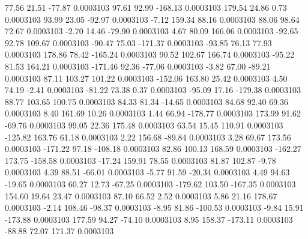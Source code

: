        77.56       21.51      -77.87     0.0003103
       97.61       92.99     -168.13     0.0003103
      179.54       24.86        0.73     0.0003103
       93.99       23.05      -92.97     0.0003103
       -7.12      159.34       88.16     0.0003103
       88.06       98.64       72.67     0.0003103
       -2.70       14.46      -79.90     0.0003103
        4.67       80.09      166.06     0.0003103
      -92.65       92.78      109.67     0.0003103
      -90.47       75.03     -171.37     0.0003103
      -93.85       76.13       77.93     0.0003103
      178.86       78.42     -165.24     0.0003103
       90.52      102.67      166.74     0.0003103
      -95.22       81.53      164.21     0.0003103
     -171.46       92.36      -77.06     0.0003103
       -3.82       67.00      -89.21     0.0003103
       87.11      103.27      101.22     0.0003103
     -152.06      163.80       25.42     0.0003103
        4.50       74.19       -2.41     0.0003103
      -81.22       73.38        0.37     0.0003103
      -95.09       17.16     -179.38     0.0003103
       88.77      103.65      100.75     0.0003103
       84.33       81.34      -14.65     0.0003103
       84.68       92.40       69.36     0.0003103
        8.40      161.69       10.26     0.0003103
        1.44       66.94     -178.77     0.0003103
      173.99       91.62      -69.76     0.0003103
       99.05       22.36      175.48     0.0003103
       63.54       15.45      110.91     0.0003103
     -125.82      163.76       61.18     0.0003103
        2.22      156.68      -89.84     0.0003103
        3.28       69.67      173.56     0.0003103
     -171.22       97.18     -108.18     0.0003103
       82.86      100.13      168.59     0.0003103
     -162.27      173.75     -158.58     0.0003103
      -17.24      159.91       78.55     0.0003103
       81.87      102.87       -9.78     0.0003103
        4.39       88.51      -66.01     0.0003103
       -5.77       91.59      -20.34     0.0003103
        4.49       94.63      -19.65     0.0003103
       60.27       12.73      -67.25     0.0003103
     -179.62      103.50     -167.35     0.0003103
      154.60       19.64       23.47     0.0003103
       87.10       66.52        2.52     0.0003103
        5.86       21.16      178.67     0.0003103
       -2.14      108.46      -98.37     0.0003103
       -8.95       81.86     -100.53     0.0003103
       -9.84       15.91     -173.88     0.0003103
      177.59       94.27      -74.10     0.0003103
        8.95      158.37     -173.11     0.0003103
      -88.88       72.07      171.37     0.0003103
